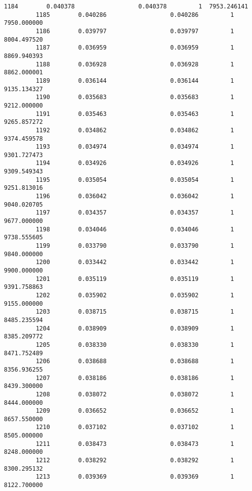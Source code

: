 \documentclass[11pt]{article}
\begin{document}
\begin{Verbatim}[commandchars=\\\{\}]
         1184        0.040378                  0.040378         1  7953.246141   
         1185        0.040286                  0.040286         1  7950.000000   
         1186        0.039797                  0.039797         1  8004.497520   
         1187        0.036959                  0.036959         1  8869.940393   
         1188        0.036928                  0.036928         1  8862.000001   
         1189        0.036144                  0.036144         1  9135.134327   
         1190        0.035683                  0.035683         1  9212.000000   
         1191        0.035463                  0.035463         1  9265.857272   
         1192        0.034862                  0.034862         1  9374.459578   
         1193        0.034974                  0.034974         1  9301.727473   
         1194        0.034926                  0.034926         1  9309.549343   
         1195        0.035054                  0.035054         1  9251.813016   
         1196        0.036042                  0.036042         1  9040.020705   
         1197        0.034357                  0.034357         1  9677.000000   
         1198        0.034046                  0.034046         1  9738.555605   
         1199        0.033790                  0.033790         1  9840.000000   
         1200        0.033442                  0.033442         1  9900.000000   
         1201        0.035119                  0.035119         1  9391.758863   
         1202        0.035902                  0.035902         1  9155.000000   
         1203        0.038715                  0.038715         1  8485.235594   
         1204        0.038909                  0.038909         1  8385.209772   
         1205        0.038330                  0.038330         1  8471.752489   
         1206        0.038688                  0.038688         1  8356.936255   
         1207        0.038186                  0.038186         1  8439.300000   
         1208        0.038072                  0.038072         1  8444.000000   
         1209        0.036652                  0.036652         1  8657.550000   
         1210        0.037102                  0.037102         1  8505.000000   
         1211        0.038473                  0.038473         1  8248.000000   
         1212        0.038292                  0.038292         1  8300.295132   
         1213        0.039369                  0.039369         1  8122.700000   
         

\end{Verbatim}
\end{document}
